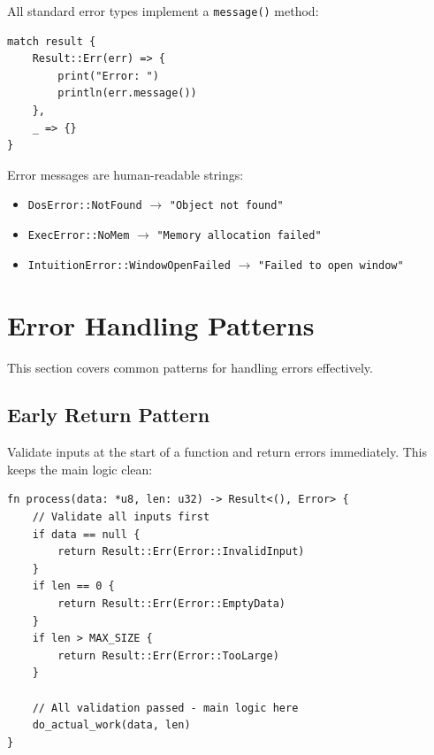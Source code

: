 All standard error types implement a \texttt{message()} method:

\begin{lstlisting}
match result {
    Result::Err(err) => {
        print("Error: ")
        println(err.message())
    },
    _ => {}
}
\end{lstlisting}

Error messages are human-readable strings:
\begin{itemize}
    \item \texttt{DosError::NotFound} $\rightarrow$ \texttt{"Object not found"}
    \item \texttt{ExecError::NoMem} $\rightarrow$ \texttt{"Memory allocation failed"}
    \item \texttt{IntuitionError::WindowOpenFailed} $\rightarrow$ \texttt{"Failed to open window"}
\end{itemize}

\section{Error Handling Patterns}
\label{sec:error-patterns}

This section covers common patterns for handling errors effectively.

\subsection{Early Return Pattern}

Validate inputs at the start of a function and return errors immediately. This keeps the main logic clean:

\begin{lstlisting}
fn process(data: *u8, len: u32) -> Result<(), Error> {
    // Validate all inputs first
    if data == null {
        return Result::Err(Error::InvalidInput)
    }
    if len == 0 {
        return Result::Err(Error::EmptyData)
    }
    if len > MAX_SIZE {
        return Result::Err(Error::TooLarge)
    }

    // All validation passed - main logic here
    do_actual_work(data, len)
}
\end{lstlisting}

